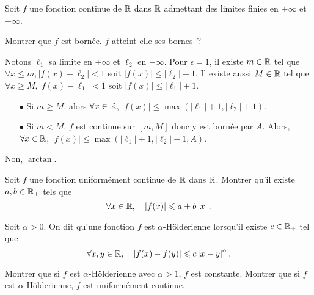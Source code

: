 \documentclass{magnolia}
\begin{document}
Soit $f$ une fonction continue de $\mathbb{R}$ dans $\mathbb{R}$ admettant des limites finies
en $+\infty$ et $-\infty$.
\begin{questions}
\question Montrer que $f$ est bornée.
\question $f$ atteint-elle ses bornes~?
\end{questions}

\begin{sol}
\begin{questions}
\question Notons $\ell_1$ sa limite en $+\infty$ et $\ell_2$ en $-\infty$. Pour $\epsilon=1$, il existe $m\in \mathbb{R}$ tel que $\forall x\leq m, |f(x)-\ell_2|<1$ soit $|f(x)|\leq |\ell_2|+1$. Il existe aussi $M\in \mathbb{R}$ tel que $\forall x\geq M, |f(x)-\ell_1|<1$ soit $|f(x)|\leq |\ell_1|+1$.
\begin{itemize}
\item[$\bullet$] Si $m\geq M$, alors $\forall x \in \mathbb{R}$, $|f(x)|\leq \max(|\ell_1|+1,|\ell_2|+1)$.
\item[$\bullet$] Si $m<M$, $f$ est continue sur $[m,M]$ donc y est bornée par $A$. Alors, $\forall x \in \mathbb{R}$, $|f(x)|\leq \max(|\ell_1|+1,|\ell_2|+1,A)$.
\end{itemize}
\question Non, $\arctan$.
\end{questions}
\end{sol}


Soit $f$ une fonction uniformément continue de $\mathbb{R}$ dans $\mathbb{R}$. Montrer qu'il
existe $a,b\in\mathbb{R}_+$ tels que
\[\forall x\in\mathbb{R} ,\quad \left|f(x)\right|\leqslant a+b\left|x\right|.\]


Soit $\alpha>0$. On dit qu'une fonction $f$ est $\alpha$-Hölderienne lorsqu'il
existe $c\in\mathbb{R}_+$ tel que
\[\forall x,y\in\mathbb{R} ,\quad \left|f(x)-f(y)\right|\leqslant c\left|x-y\right|^{\alpha}.\]
\begin{questions}
\question Montrer que si $f$ est $\alpha$-Hölderienne avec $\alpha>1$, $f$ est
  constante.
\question Montrer que si $f$ est $\alpha$-Hölderienne, $f$ est uniformément
  continue.
\end{questions}
\end{document}

